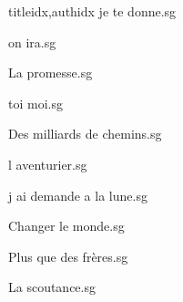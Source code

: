 \documentclass[
    ]{article}
\begin{document}
\begin{songs}{titleidx,authidx}
{je te donne.sg}


{on ira.sg}


{La promesse.sg}


{toi moi.sg}


{Des milliards de chemins.sg}


{l aventurier.sg}


{j ai demande a la lune.sg}


{Changer le monde.sg}


{Plus que des frères.sg}


{La scoutance.sg}


\end{songs}
\end{document}
